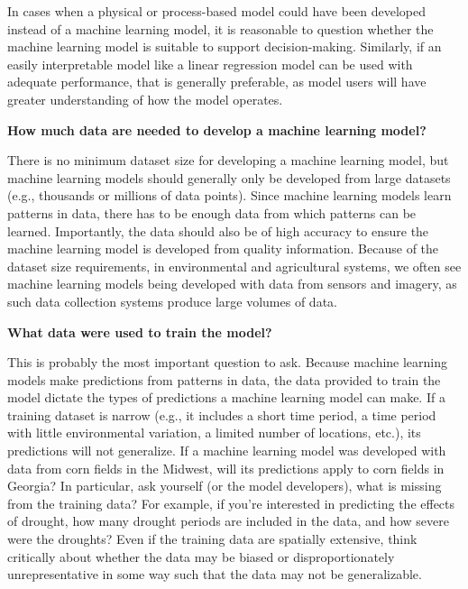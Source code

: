 \documentclass[
]{book}
\begin{document}
In cases when a physical or process-based model could have been developed instead of a machine learning model, it is reasonable to question whether the machine learning model is suitable to support decision-making. Similarly, if an easily interpretable model like a linear regression model can be used with adequate performance, that is generally preferable, as model users will have greater understanding of how the model operates.

\textbf{How much data are needed to develop a machine learning model?}

There is no minimum dataset size for developing a machine learning model, but machine learning models should generally only be developed from large datasets (e.g., thousands or millions of data points). Since machine learning models learn patterns in data, there has to be enough data from which patterns can be learned. Importantly, the data should also be of high accuracy to ensure the machine learning model is developed from quality information. Because of the dataset size requirements, in environmental and agricultural systems, we often see machine learning models being developed with data from sensors and imagery, as such data collection systems produce large volumes of data.

\textbf{What data were used to train the model?}

This is probably the most important question to ask. Because machine learning models make predictions from patterns in data, the data provided to train the model dictate the types of predictions a machine learning model can make. If a training dataset is narrow (e.g., it includes a short time period, a time period with little environmental variation, a limited number of locations, etc.), its predictions will not generalize. If a machine learning model was developed with data from corn fields in the Midwest, will its predictions apply to corn fields in Georgia? In particular, ask yourself (or the model developers), what is missing from the training data? For example, if you're interested in predicting the effects of drought, how many drought periods are included in the data, and how severe were the droughts? Even if the training data are spatially extensive, think critically about whether the data may be biased or disproportionately unrepresentative in some way such that the data may not be generalizable.
\end{document}
